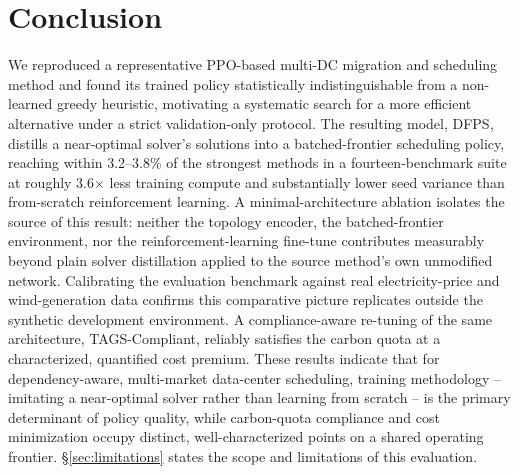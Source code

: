 \documentclass[journal]{IEEEtran}
\begin{document}
\section{Conclusion}
We reproduced a representative PPO-based multi-DC migration and scheduling method and found its trained policy statistically indistinguishable from a non-learned greedy heuristic, motivating a systematic search for a more efficient alternative under a strict validation-only protocol. The resulting model, DFPS, distills a near-optimal solver's solutions into a batched-frontier scheduling policy, reaching within 3.2--3.8\% of the strongest methods in a fourteen-benchmark suite at roughly 3.6$\times$ less training compute and substantially lower seed variance than from-scratch reinforcement learning. A minimal-architecture ablation isolates the source of this result: neither the topology encoder, the batched-frontier environment, nor the reinforcement-learning fine-tune contributes measurably beyond plain solver distillation applied to the source method's own unmodified network. Calibrating the evaluation benchmark against real electricity-price and wind-generation data confirms this comparative picture replicates outside the synthetic development environment. A compliance-aware re-tuning of the same architecture, TAGS-Compliant, reliably satisfies the carbon quota at a characterized, quantified cost premium. These results indicate that for dependency-aware, multi-market data-center scheduling, training methodology -- imitating a near-optimal solver rather than learning from scratch -- is the primary determinant of policy quality, while carbon-quota compliance and cost minimization occupy distinct, well-characterized points on a shared operating frontier. \S\ref{sec:limitations} states the scope and limitations of this evaluation.
\end{document}
